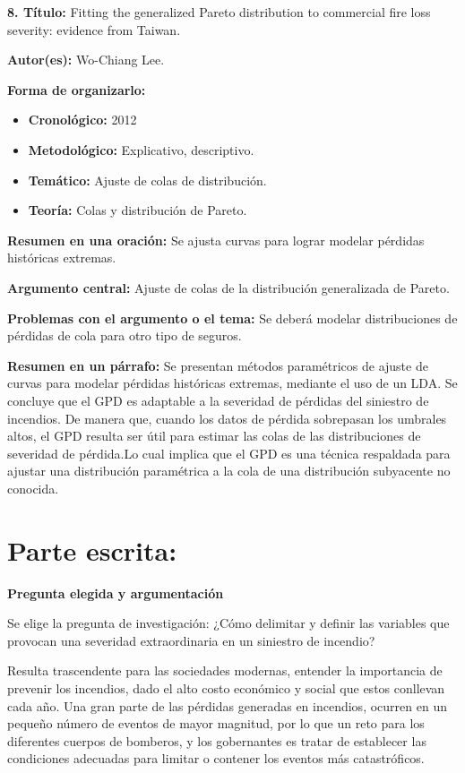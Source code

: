 \documentclass[
  oneside]{memoir}
\begin{document}
\textbf{ 8. Título:} Fitting the generalized Pareto distribution to
commercial fire loss severity: evidence from Taiwan.

\textbf{Autor(es):} Wo-Chiang Lee.

\textbf{Forma de organizarlo:}

\begin{itemize}

\item \textbf{Cronológico:} 2012

\item \textbf{Metodológico:} Explicativo, descriptivo.

\item \textbf{Temático:} Ajuste de colas de distribución.

\item \textbf{Teoría:} Colas y distribución de Pareto.
\end{itemize}

\textbf{Resumen en una oración:} Se ajusta curvas para lograr modelar
pérdidas históricas extremas.

\textbf{Argumento central:} Ajuste de colas de la distribución
generalizada de Pareto.

\textbf{Problemas con el argumento o el tema:} Se deberá modelar
distribuciones de pérdidas de cola para otro tipo de seguros.

\textbf{Resumen en un párrafo:} Se presentan métodos paramétricos de
ajuste de curvas para modelar pérdidas históricas extremas, mediante el
uso de un LDA. Se concluye que el GPD es adaptable a la severidad de
pérdidas del siniestro de incendios. De manera que, cuando los datos de
pérdida sobrepasan los umbrales altos, el GPD resulta ser útil para
estimar las colas de las distribuciones de severidad de pérdida.Lo cual
implica que el GPD es una técnica respaldada para ajustar una
distribución paramétrica a la cola de una distribución subyacente no
conocida.

\section{Parte escrita:}

\textbf{Pregunta elegida y argumentación}

Se elige la pregunta de investigación: ¿Cómo delimitar y definir las
variables que provocan una severidad extraordinaria en un siniestro de
incendio?

Resulta trascendente para las sociedades modernas, entender la
importancia de prevenir los incendios, dado el alto costo económico y
social que estos conllevan cada año. Una gran parte de las pérdidas
generadas en incendios, ocurren en un pequeño número de eventos de mayor
magnitud, por lo que un reto para los diferentes cuerpos de bomberos, y
los gobernantes es tratar de establecer las condiciones adecuadas para
limitar o contener los eventos más catastróficos.
\end{document}

